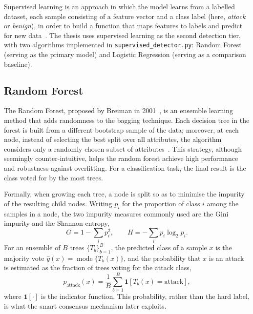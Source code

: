 Supervised learning is an approach in which the model learns from a
labelled dataset, each sample consisting of a feature vector and a class
label (here, \emph{attack} or \emph{benign}), in order to build a function
that maps features to labels and predict for new data~\cite{pham2016}. The
thesis uses supervised learning as the second detection tier, with two
algorithms implemented in \texttt{supervised\_detector.py}: Random Forest
(serving as the primary model) and Logistic Regression (serving as a
comparison baseline).

\subsection{Random Forest}

The Random Forest, proposed by Breiman in 2001~\cite{breiman2001}, is an
ensemble learning method that adds randomness to the bagging technique.
Each decision tree in the forest is built from a different bootstrap sample
of the data; moreover, at each node, instead of selecting the best split
over all attributes, the algorithm considers only a randomly chosen subset
of attributes~\cite{pham2016}. This strategy, although seemingly
counter-intuitive, helps the random forest achieve high performance and
robustness against overfitting. For a classification task, the final result
is the class voted for by the most trees.

Formally, when growing each tree, a node is split so as to minimise the
impurity of the resulting child nodes. Writing $p_i$ for the proportion of
class $i$ among the samples in a node, the two impurity measures commonly
used are the Gini impurity and the Shannon entropy,
\begin{equation}
  G = 1 - \sum_{i} p_i^{2},
  \qquad
  H = -\sum_{i} p_i \log_2 p_i .
  \label{eq:gini}
\end{equation}
For an ensemble of $B$ trees $\{T_b\}_{b=1}^{B}$, the predicted class of a
sample $x$ is the majority vote $\hat{y}(x) = \operatorname{mode}\{T_b(x)\}$,
and the probability that $x$ is an attack is estimated as the fraction of
trees voting for the attack class,
\begin{equation}
  p_{\text{attack}}(x) = \frac{1}{B}\sum_{b=1}^{B}
  \mathbf{1}\!\left[T_b(x) = \text{attack}\right],
  \label{eq:rfvote}
\end{equation}
where $\mathbf{1}[\cdot]$ is the indicator function. This probability, rather
than the hard label, is what the smart consensus mechanism later exploits.

